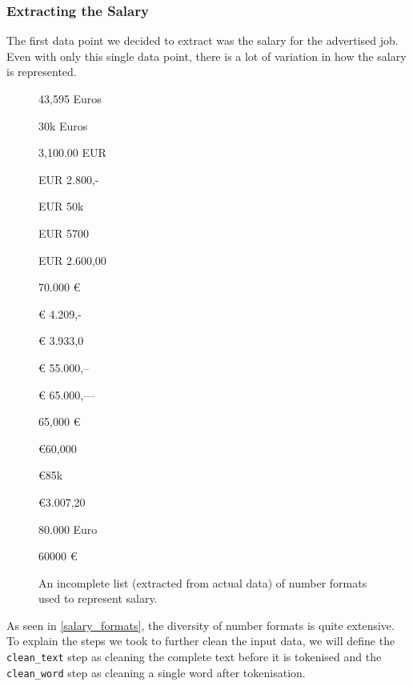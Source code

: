 \documentclass[runningheads]{llncs}
\begin{document}
\subsubsection{Extracting the Salary}
\label{subsub:extracting_the_salary}

The first data point we decided to extract was the salary for the advertised job. Even with only this single data point, there is a lot of variation in how the salary is represented.

\begin{figure}
	\centering

  \begin{multicols}{3}
    \begin{description}
      \item 43,595 Euros
      \item 30k Euros
      \item 3,100.00 EUR
      \item EUR 2.800,-
      \item EUR 50k
      \item EUR 5700
      \item EUR 2.600,00
      \item 70.000 €
      \item € 4.209,-
      \item € 3.933,0
      \item € 55.000,--
      \item € 65.000,---
      \item 65,000 €
      \item €60,000
      \item €85k
      \item €3.007,20
      \item 80.000 Euro
      \item 60000 €
    \end{description}
  \end{multicols}

  \caption{An incomplete list (extracted from actual data) of number formats used to represent salary.}
  \label{salary_formats}
\end{figure}

As seen in \autoref{salary_formats}, the diversity of number formats is quite extensive. To explain the steps we took to further clean the input data, we will define the \texttt{clean\_text} step as cleaning the complete text before it is tokenised and the \texttt{clean\_word} step as cleaning a single word after tokenisation.
\end{document}
